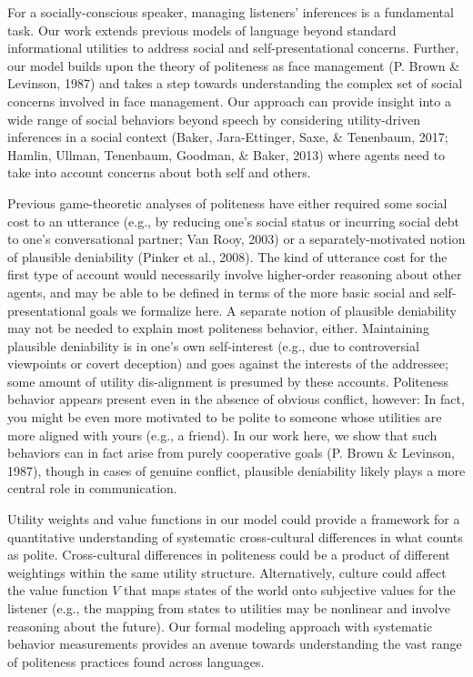 \documentclass[oneside]{report}
\begin{document}
For a socially-conscious speaker, managing listeners' inferences is a
fundamental task. Our work extends previous models of language beyond
standard informational utilities to address social and
self-presentational concerns. Further, our model builds upon the theory
of politeness as face management (P. Brown \& Levinson, 1987) and takes
a step towards understanding the complex set of social concerns involved
in face management. Our approach can provide insight into a wide range
of social behaviors beyond speech by considering utility-driven
inferences in a social context (Baker, Jara-Ettinger, Saxe, \&
Tenenbaum, 2017; Hamlin, Ullman, Tenenbaum, Goodman, \& Baker, 2013)
where agents need to take into account concerns about both self and
others.

Previous game-theoretic analyses of politeness have either required some
social cost to an utterance (e.g., by reducing one's social status or
incurring social debt to one's conversational partner; Van Rooy, 2003)
or a separately-motivated notion of plausible deniability (Pinker et
al., 2008). The kind of utterance cost for the first type of account
would necessarily involve higher-order reasoning about other agents, and
may be able to be defined in terms of the more basic social and
self-presentational goals we formalize here. A separate notion of
plausible deniability may not be needed to explain most politeness
behavior, either. Maintaining plausible deniability is in one's own
self-interest (e.g., due to controversial viewpoints or covert
deception) and goes against the interests of the addressee; some amount
of utility dis-alignment is presumed by these accounts. Politeness
behavior appears present even in the absence of obvious conflict,
however: In fact, you might be even more motivated to be polite to
someone whose utilities are more aligned with yours (e.g., a friend). In
our work here, we show that such behaviors can in fact arise from purely
cooperative goals (P. Brown \& Levinson, 1987), though in cases of
genuine conflict, plausible deniability likely plays a more central role
in communication.

Utility weights and value functions in our model could provide a
framework for a quantitative understanding of systematic cross-cultural
differences in what counts as polite. Cross-cultural differences in
politeness could be a product of different weightings within the same
utility structure. Alternatively, culture could affect the value
function \(V\) that maps states of the world onto subjective values for
the listener (e.g., the mapping from states to utilities may be
nonlinear and involve reasoning about the future). Our formal modeling
approach with systematic behavior measurements provides an avenue
towards understanding the vast range of politeness practices found
across languages.
\end{document}
